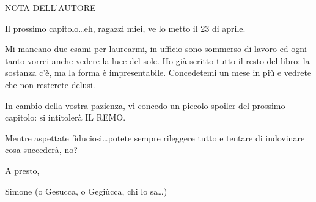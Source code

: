 NOTA DELL'AUTORE

Il prossimo capitolo\ldots eh, ragazzi miei, ve lo metto il 23 di aprile.

Mi mancano due esami per laurearmi, in ufficio sono sommerso di lavoro ed ogni tanto vorrei anche vedere la luce del sole. Ho già scritto tutto il resto del libro: la sostanza c'è, ma la forma è impresentabile. Concedetemi un mese in più e vedrete che non resterete delusi.

In cambio della vostra pazienza, vi concedo un piccolo spoiler del prossimo capitolo: si intitolerà IL REMO.

Mentre aspettate fiduciosi\ldots potete sempre rileggere tutto e tentare di indovinare cosa succederà, no?

A presto,

Simone (o Gesucca, o Gegiùcca, chi lo sa\ldots)



